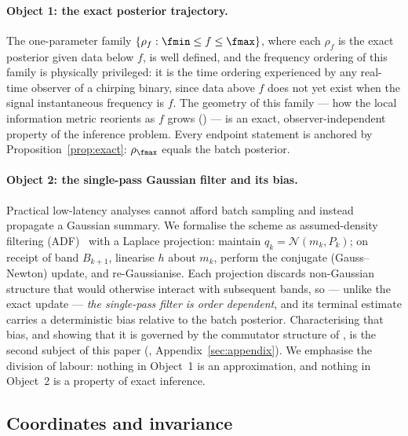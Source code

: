 \paragraph{Object 1: the exact posterior trajectory.}
The one-parameter family $\{\rho_f : \fmin \le f \le \fmax\}$, where
each $\rho_f$ is the exact posterior given data below $f$, is
well defined, and the frequency ordering of this family is physically
privileged: it is the time ordering experienced by any real-time
observer of a chirping binary, since data above $f$ does not yet exist
when the signal instantaneous frequency is $f$. The geometry of this
family --- how the local information metric reorients as $f$ grows
() --- is an exact, observer-independent property of
the inference problem. Every endpoint statement is anchored by
Proposition~\ref{prop:exact}: $\rho_{\fmax}$ equals the batch
posterior.

\paragraph{Object 2: the single-pass Gaussian filter and its bias.}
Practical low-latency analyses cannot afford batch sampling and instead
propagate a Gaussian summary. We formalise the scheme as
assumed-density filtering (ADF)~{\cite{minka2001ep,opper1998online}} with
a Laplace projection: maintain
$q_k = \mathcal{N}(m_k, P_k)$; on receipt of band $B_{k+1}$, linearise
$h$ about $m_k$, perform the conjugate (Gauss--Newton) update, and
re-Gaussianise. Each projection discards non-Gaussian structure that
would otherwise interact with subsequent bands, so --- unlike the exact
update --- \emph{the single-pass filter is order dependent}, and its
terminal estimate carries a deterministic bias relative to the batch
posterior. Characterising that bias, and showing that it is governed by
the commutator structure of , is the second
subject of this paper (, Appendix~{\ref{sec:appendix}}).
We emphasise the division of labour: nothing in Object~1 is an
approximation, and nothing in Object~2 is a property of exact
inference.

\subsection{Coordinates and invariance}
\label{sec:coordinates}

